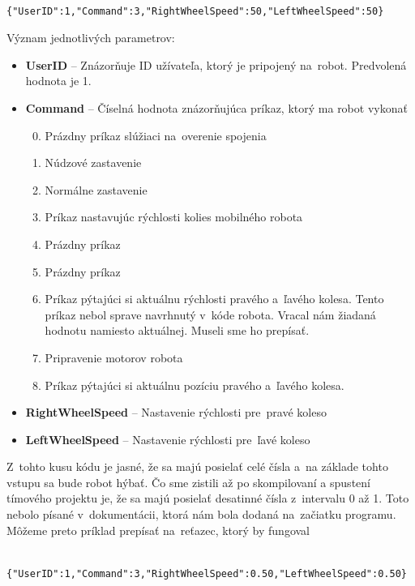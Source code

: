 	\label{jsonSpeedRequestBad}
	\begin{lstlisting}
			{"UserID":1,"Command":3,"RightWheelSpeed":50,"LeftWheelSpeed":50}
	\end{lstlisting}

	\newpage

	\noindent Význam jednotlivých parametrov:
	\begin{itemize}
		\item \textbf{UserID} -- Znázorňuje ID užívateľa, ktorý je pripojený na~robot. Predvolená hodnota je 1.
		\item \textbf{Command} --  Číselná hodnota znázorňujúca príkaz, ktorý ma robot vykonať
			\begin{enumerate}
				\setcounter{enumi}{-1}
				\item \label{c0} Prázdny príkaz slúžiaci na~overenie spojenia
				\item \label{c1} Núdzové zastavenie
				\item \label{c2} Normálne zastavenie
				\item \label{c3} Príkaz nastavujúc rýchlosti kolies mobilného robota
				\item \label{c4} Prázdny príkaz
				\item \label{c5} Prázdny príkaz
				\item \label{c6} Príkaz pýtajúci si aktuálnu rýchlosti pravého a~ľavého kolesa. Tento príkaz nebol sprave navrhnutý v~kóde
					robota. Vracal nám žiadaná hodnotu namiesto aktuálnej. Museli sme ho prepísať.
				\item \label{c7} Pripravenie motorov robota
				\item \label{c8} Príkaz pýtajúci si aktuálnu pozíciu pravého a~ľavého kolesa.
			\end{enumerate}
		\item \textbf{RightWheelSpeed} -- Nastavenie rýchlosti pre~pravé koleso
		\item \textbf{LeftWheelSpeed} -- Nastavenie rýchlosti pre~ľavé koleso
	\end{itemize}

	\noindent Z~tohto kusu kódu je jasné, že sa majú posielať celé čísla a~na základe tohto vstupu sa bude robot hýbať. Čo sme zistili až
	po skompilovaní a spustení tímového projektu je, že sa majú posielať desatinné čísla z~intervalu 0 až 1. Toto nebolo písané
	v~dokumentácii, ktorá nám bola dodaná na~začiatku programu. Môžeme preto príklad prepísať na~reťazec, ktorý by fungoval

	\label{jsonSpeedRequestGood}
	\begin{lstlisting}
			{"UserID":1,"Command":3,"RightWheelSpeed":0.50,"LeftWheelSpeed":0.50}
	\end{lstlisting}

